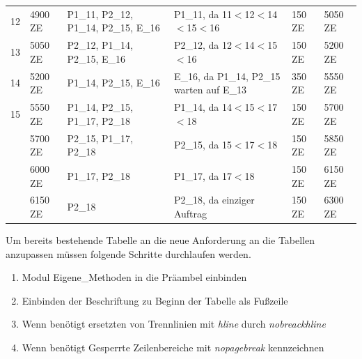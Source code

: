 \documentclass[13pt,a4paper, listof=entryprefix, bibliography=totocnumbered,toc=listofnumbered,lof=listofnumbered]{scrartcl}
\begin{document}
\begin{tabularx}{\linewidth}{|p{0.6cm}|p{}|>{\raggedright}p{}|>{\raggedright}p{5cm}|X|X|}
	12  & 4900 ZE & P1\_11, P2\_12, P1\_14, P2\_15, E\_16 & P1\_11, da 11$<$12$<$14$<$15$<$16                     & 150 ZE & 5050 ZE \\
	13  & 5050 ZE & P2\_12, P1\_14, P2\_15, E\_16         & P2\_12, da 12$<$14$<$15$<$16                          & 150 ZE & 5200 ZE \\
	14  & 5200 ZE & P1\_14, P2\_15, E\_16                 & E\_16, da P1\_14, P2\_15 warten auf E\_13             & 350 ZE & 5550 ZE \\
	15  & 5550 ZE & P1\_14, P2\_15, P1\_17, P2\_18        & P1\_14, da 14$<$15$<$17$<$18                          & 150 ZE & 5700 ZE \\ \nopagebreak
	16  & 5700 ZE & P2\_15, P1\_17, P2\_18                & P2\_15, da 15$<$17$<$18                               & 150 ZE & 5850 ZE \\ \nopagebreak
	17  & 6000 ZE & P1\_17, P2\_18                        & P1\_17, da 17$<$18                                    & 150 ZE & 6150 ZE \\ \nopagebreak
	18  & 6150 ZE & P2\_18                                & P2\_18, da einziger Auftrag                           & 150 ZE & 6300 ZE
	\label{tab:fifo_d6}
\end{tabularx}

Um bereits bestehende Tabelle an die neue Anforderung an die Tabellen anzupassen müssen folgende Schritte durchlaufen werden.

\begin{enumerate}
	\item Modul Eigene\_Methoden in die Präambel einbinden
	\item Einbinden der Beschriftung zu Beginn der Tabelle als Fußzeile
	\item Wenn benötigt ersetzten von Trennlinien mit \textit{hline} durch \textit{nobreackhline}
	\item Wenn benötigt Gesperrte Zeilenbereiche mit \textit{nopagebreak} kennzeichnen
\end{enumerate}
\end{document}
